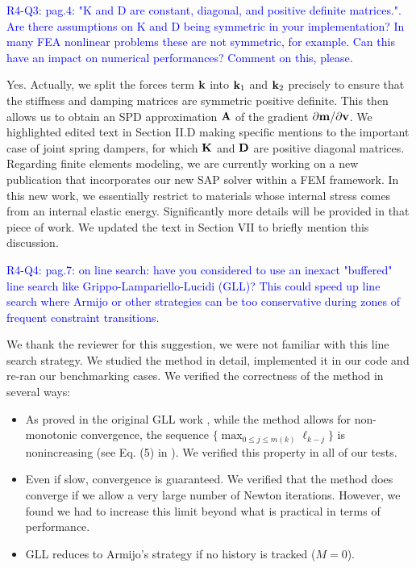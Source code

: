 \vspace{5mm}

\textcolor{blue}{R4-Q3: pag.4: "K and D are constant, diagonal, and positive
definite matrices.". Are there assumptions on K and D being symmetric in your
implementation? In many FEA nonlinear problems these are not symmetric, for
example. Can this have an impact on numerical performances? Comment on this,
please.}

Yes. Actually, we split the forces term ${\mathbf{k}}$ into ${\mathbf{k}}_1$ and ${\mathbf{k}}_2$
precisely to ensure that the stiffness and damping matrices are symmetric
positive definite. This then allows us to obtain an SPD approximation ${\mathbf{A}}$ of
the gradient $\partial {\mathbf{m}}/\partial {\mathbf{v}}$. We highlighted edited text in
Section II.D making specific mentions to the important case of joint spring
dampers, for which ${\mathbf{K}}$ and ${\mathbf{D}}$ are positive diagonal matrices.
Regarding finite elements modeling, we are currently working on a new
publication that incorporates our new SAP solver within a FEM framework. In this
new work, we essentially restrict to materials whose internal stress comes from
an internal elastic energy. Significantly more details will be provided in that
piece of work. We updated the text in Section VII to briefly mention this
discussion.

\vspace{5mm}

\textcolor{blue}{R4-Q4: pag.7: on line search: have you considered to use an
inexact "buffered" line search like Grippo-Lampariello-Lucidi (GLL)? This could
speed up line search where Armijo or other strategies can be too conservative
during zones of frequent constraint transitions.}

We thank the reviewer for this suggestion, we were not familiar with this line
search strategy. We studied the method in detail, implemented it in
our code and re-ran our benchmarking cases. We verified the correctness of the
method in several ways:
\begin{itemize}
    \item As proved in the original GLL work \cite{bib:grippo1986nonmonotone},
    while the method allows for non-monotonic convergence, the sequence
    $\{\max_{0\leq j \leq m(k)}\ell_{k-j}\}$ is nonincreasing (see Eq. (5) in
    \cite{bib:grippo1986nonmonotone}). We verified this property in all of our
    tests.
    \item Even if slow, convergence is guaranteed. We verified that the method
    does converge if we allow a very large number of Newton iterations. However,
    we found we had to increase this limit beyond what is practical in terms of
    performance.
    \item GLL reduces to Armijo's strategy if no history is tracked ($M=0$).
\end{itemize}

